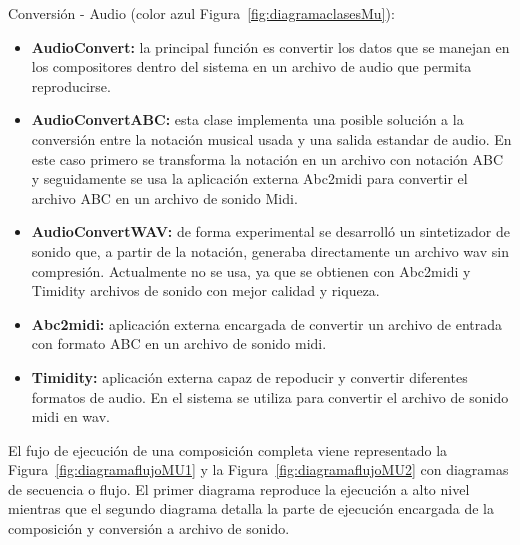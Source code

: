 Conversión - Audio (color azul Figura~\ref{fig:diagramaclasesMu}):

\begin{itemize}
	
	\item \textbf{AudioConvert:} la principal función es convertir los datos que se manejan en los compositores dentro del sistema en un archivo de audio que permita reproducirse.

	\item \textbf{AudioConvertABC:} esta clase implementa una posible solución a la conversión entre la notación musical usada y una salida estandar de audio. En este caso primero se transforma la notación en un archivo con notación ABC y seguidamente se usa la aplicación externa Abc2midi para convertir el archivo ABC en un archivo de sonido Midi.

	\item \textbf{AudioConvertWAV:} de forma experimental se desarrolló un sintetizador de sonido que, a partir de la notación, generaba directamente un archivo wav sin compresión. Actualmente no se usa, ya que se obtienen con Abc2midi y Timidity archivos de sonido con mejor calidad y riqueza.

	\item \textbf{Abc2midi:} aplicación externa encargada de convertir un archivo de entrada con formato ABC en un archivo de sonido midi.

	\item \textbf{Timidity:} aplicación externa capaz de repoducir y convertir diferentes formatos de audio. En el sistema se utiliza para convertir el archivo de sonido midi en wav.

\end{itemize}
	
El fujo de ejecución de una composición completa viene representado la Figura~\ref{fig:diagramaflujoMU1} y la Figura~\ref{fig:diagramaflujoMU2} con diagramas de secuencia o flujo. El primer diagrama reproduce la ejecución a alto nivel mientras que el segundo diagrama detalla la parte de ejecución encargada de la composición y conversión a archivo de sonido.

